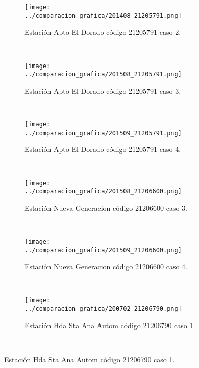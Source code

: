 \begin{figure}[H]\ContinuedFloat
\centering
\begin{subfigure}[normla]{0.4\textwidth}
\caption{Estación Apto El Dorado código 21205791 caso 2.}
\texttt{[image: ../comparacion\_grafica/201408\_21205791.png]}
\end{subfigure}
~
\begin{subfigure}[normla]{0.4\textwidth}
\caption{Estación Apto El Dorado código 21205791 caso 3.}
\texttt{[image: ../comparacion\_grafica/201508\_21205791.png]}
\end{subfigure}
~
\begin{subfigure}[normla]{0.4\textwidth}
\caption{Estación Apto El Dorado código 21205791 caso 4.}
\texttt{[image: ../comparacion\_grafica/201509\_21205791.png]}
\end{subfigure}
~
\begin{subfigure}[normla]{0.4\textwidth}
\caption{Estación Nueva Generacion código 21206600 caso 3.}
\texttt{[image: ../comparacion\_grafica/201508\_21206600.png]}
\end{subfigure}
~
\begin{subfigure}[normla]{0.4\textwidth}
\caption{Estación Nueva Generacion código 21206600 caso 4.}
\texttt{[image: ../comparacion\_grafica/201509\_21206600.png]}
\end{subfigure}
~
\begin{subfigure}[normla]{0.4\textwidth}
\caption{Estación Hda Sta Ana Autom código 21206790 caso 1.}
\texttt{[image: ../comparacion\_grafica/200702\_21206790.png]}
\end{subfigure}
~
\end{figure}
           
